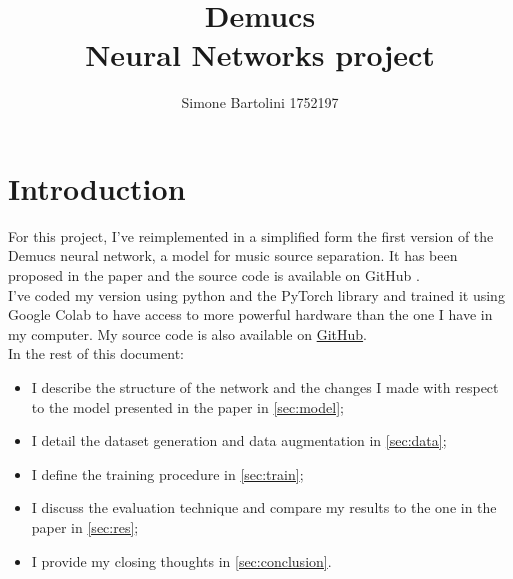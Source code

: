 \documentclass[12pt]{article}
\title{Demucs \\ \large Neural Networks project}
\author{Simone Bartolini 1752197}
\date{}
\begin{document}
\maketitle
\thispagestyle{empty}



\section{Introduction}\label{sec:intro}
For this project, I've reimplemented in a simplified form the first version of the Demucs neural network, a model for music source separation. It has been proposed in the paper \cite{Defossez_2019} and the source code is available on GitHub \cite{Demucs_code}.\\
I've coded my version using python and the PyTorch library and trained it using Google Colab to have access to more powerful hardware than the one I have in my computer. My source code is also available on \href{https://github.com/51m0n397/NN-project/tree/main/code}{GitHub}. \\
In the rest of this document: 
\begin{itemize}
\item I describe the structure of the network and the changes I made with respect to the model presented in the paper in \autoref{sec:model};
\item I detail the dataset generation and data augmentation in  \autoref{sec:data};
\item I define the training procedure in \autoref{sec:train};
\item I discuss the evaluation technique and compare my results to the one in the paper in \autoref{sec:res};
\item I provide my closing thoughts in \autoref{sec:conclusion}.
\end{itemize}


\newpage
\end{document}
